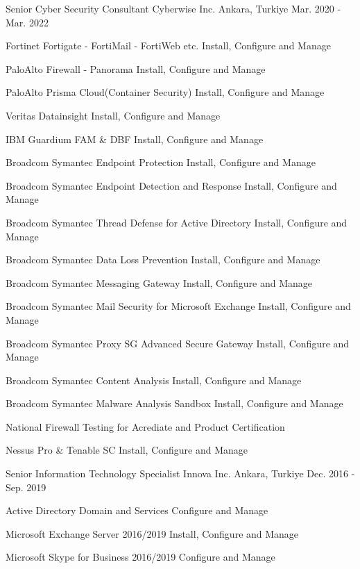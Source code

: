 \begin{cventries}
  \cventry
    {Senior Cyber Security Consultant} %
    {Cyberwise Inc.} %
    {Ankara, Turkiye} %
    {Mar. 2020 - Mar. 2022} %
    {
      \begin{cvitems} %
        \item {Fortinet Fortigate - FortiMail - FortiWeb etc. Install, Configure and Manage}
        \item {PaloAlto Firewall - Panorama Install, Configure and Manage}
        \item {PaloAlto Prisma Cloud(Container Security) Install, Configure and Manage}
        \item {Veritas Datainsight Install, Configure and Manage}
        \item {IBM Guardium FAM \& DBF Install, Configure and Manage}
        \item {Broadcom Symantec Endpoint Protection Install, Configure and Manage}
        \item {Broadcom Symantec Endpoint Detection and Response Install, Configure and Manage}
        \item {Broadcom Symantec Thread Defense for Active Directory Install, Configure and Manage}   
        \item {Broadcom Symantec Data Loss Prevention Install, Configure and Manage}
        \item {Broadcom Symantec Messaging Gateway Install, Configure and Manage}
        \item {Broadcom Symantec Mail Security for Microsoft Exchange Install, Configure and Manage}
        \item {Broadcom Symantec Proxy SG Advanced Secure Gateway Install, Configure and Manage}
        \item {Broadcom Symantec Content Analysis Install, Configure and Manage}
        \item {Broadcom Symantec Malware Analysis Sandbox Install, Configure and Manage}
        \item {National Firewall Testing for Acrediate and Product Certification}
        \item {Nessus Pro \& Tenable SC Install, Configure and Manage}
      \end{cvitems}
    }
    
  \cventry
    {Senior Information Technology Specialist} %
    {Innova Inc.} %
    {Ankara, Turkiye} %
    {Dec. 2016 - Sep. 2019} %
    {
      \begin{cvitems} %
        \item {Active Directory Domain and Services Configure and Manage}
        \item {Microsoft Exchange Server 2016/2019 Install, Configure and Manage}
        \item {Microsoft Skype for Business 2016/2019 Configure and Manage}
      \end{cvitems}
    }


\end{cventries}
